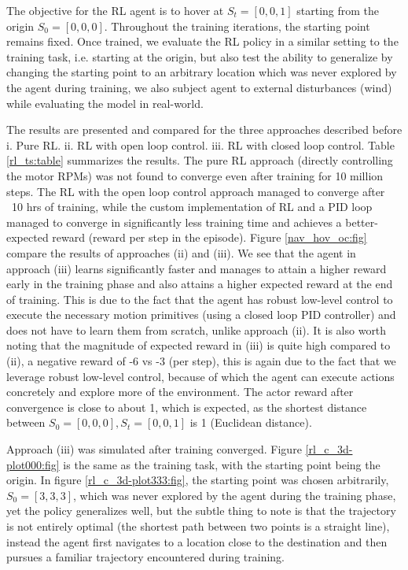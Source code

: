 \documentclass[../templateLTHtwocol.tex]{subfiles}
\begin{document}
The objective for the RL agent is to hover at $S_t = [0, 0, 1]$ starting from the origin $S_0 = [0, 0, 0]$. Throughout the training iterations, the starting point remains fixed. Once trained, we evaluate the RL policy in a similar setting to the training task, i.e. starting at the origin, but also test the ability to generalize by changing the starting point to an arbitrary location which was never explored by the agent during training, we also subject agent to external disturbances (wind) while evaluating the model in real-world.

The results are presented and compared for the three approaches described before i. Pure RL. ii. RL with open loop control. iii. RL with closed loop control. Table \ref{rl_ts:table} summarizes the results. The pure RL approach (directly controlling the motor RPMs) was not found to converge even after training for 10 million steps. The RL with the open loop control approach managed to converge after ~10 hrs of training, while the custom implementation of RL and a PID loop managed to converge in significantly less training time and achieves a better-expected reward (reward per step in the episode). Figure \ref{nav_hov_oc:fig} compare the results of approaches (ii) and (iii). We see that the agent in approach (iii) learns significantly faster and manages to attain a higher reward early in the training phase and also attains a higher expected reward at the end of training. This is due to the fact that the agent has robust low-level control to execute the necessary motion primitives (using a closed loop PID controller) and does not have to learn them from scratch, unlike approach (ii). It is also worth noting that the magnitude of expected reward in (iii) is quite high compared to (ii), a negative reward of -6 vs -3 (per step), this is again due to the fact that we leverage robust low-level control, because of which the agent can execute actions concretely and explore more of the environment.
The actor reward after convergence is close to about 1, which is expected, as the shortest distance between $S_0 = [0, 0, 0], S_t = [0, 0, 1]$ is 1 (Euclidean distance).

Approach (iii) was simulated after training converged. Figure \ref{rl_c_3d-plot000:fig} is the same as the training task, with the starting point being the origin. In figure \ref{rl_c_3d-plot333:fig}, the starting point was chosen arbitrarily, $S_0=[3, 3, 3]$, which was never explored by the agent during the training phase, yet the policy generalizes well, but the subtle thing to note is that the trajectory is not entirely optimal (the shortest path between two points is a straight line), instead the agent first navigates to a location close to the destination and then pursues a familiar trajectory encountered during training.
\end{document}
